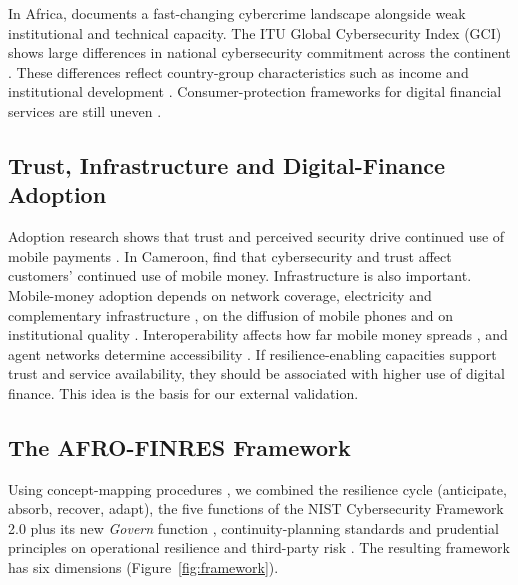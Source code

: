 \documentclass[11pt,a4paper]{article}
\begin{document}
In Africa, \citet{Kshetri2019} documents a fast-changing cybercrime landscape alongside weak institutional and technical capacity. The ITU Global Cybersecurity Index (GCI) shows large differences in national cybersecurity commitment across the continent \citep{ITU2024GCI}. These differences reflect country-group characteristics such as income and institutional development \citep{Donalds2022}. Consumer-protection frameworks for digital financial services are still uneven \citep{DiCastri2023}.

\subsection{Trust, Infrastructure and Digital-Finance Adoption}

Adoption research shows that trust and perceived security drive continued use of mobile payments \citep{Cao2018}. In Cameroon, \citet{Mvogo2026} find that cybersecurity and trust affect customers' continued use of mobile money. Infrastructure is also important. Mobile-money adoption depends on network coverage, electricity and complementary infrastructure \citep{Mothobi2017}, on the diffusion of mobile phones and on institutional quality \citep{Lashitew2019}. Interoperability affects how far mobile money spreads \citep{Brunnermeier2023}, and agent networks determine accessibility \citep{Johnen2023}. If resilience-enabling capacities support trust and service availability, they should be associated with higher use of digital finance. This idea is the basis for our external validation.

\subsection{The AFRO-FINRES Framework}

Using concept-mapping procedures \citep{Jabareen2009}, we combined the resilience cycle (anticipate, absorb, recover, adapt), the five functions of the NIST Cybersecurity Framework 2.0 plus its new \emph{Govern} function \citep{NIST2024}, continuity-planning standards \citep{Swanson2010,ISO22301,ISO27001} and prudential principles on operational resilience and third-party risk \citep{BCBS2021,FSB2023,CPMI2016}. The resulting framework has six dimensions (Figure~\ref{fig:framework}).
\end{document}
